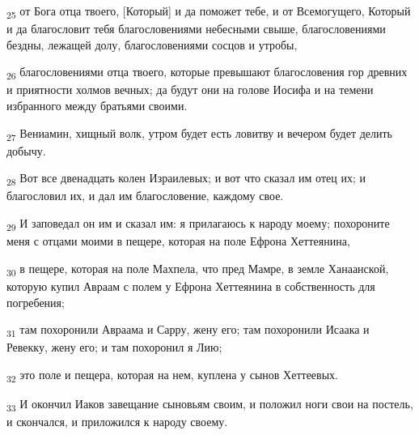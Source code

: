 \begin{tcolorbox}
\textsubscript{25} от Бога отца твоего, [Который] и да поможет тебе, и от Всемогущего, Который и да благословит тебя благословениями небесными свыше, благословениями бездны, лежащей долу, благословениями сосцов и утробы,
\end{tcolorbox}
\begin{tcolorbox}
\textsubscript{26} благословениями отца твоего, которые превышают благословения гор древних и приятности холмов вечных; да будут они на голове Иосифа и на темени избранного между братьями своими.
\end{tcolorbox}
\begin{tcolorbox}
\textsubscript{27} Вениамин, хищный волк, утром будет есть ловитву и вечером будет делить добычу.
\end{tcolorbox}
\begin{tcolorbox}
\textsubscript{28} Вот все двенадцать колен Израилевых; и вот что сказал им отец их; и благословил их, и дал им благословение, каждому свое.
\end{tcolorbox}
\begin{tcolorbox}
\textsubscript{29} И заповедал он им и сказал им: я прилагаюсь к народу моему; похороните меня с отцами моими в пещере, которая на поле Ефрона Хеттеянина,
\end{tcolorbox}
\begin{tcolorbox}
\textsubscript{30} в пещере, которая на поле Махпела, что пред Мамре, в земле Ханаанской, которую купил Авраам с полем у Ефрона Хеттеянина в собственность для погребения;
\end{tcolorbox}
\begin{tcolorbox}
\textsubscript{31} там похоронили Авраама и Сарру, жену его; там похоронили Исаака и Ревекку, жену его; и там похоронил я Лию;
\end{tcolorbox}
\begin{tcolorbox}
\textsubscript{32} это поле и пещера, которая на нем, куплена у сынов Хеттеевых.
\end{tcolorbox}
\begin{tcolorbox}
\textsubscript{33} И окончил Иаков завещание сыновьям своим, и положил ноги свои на постель, и скончался, и приложился к народу своему.
\end{tcolorbox}

